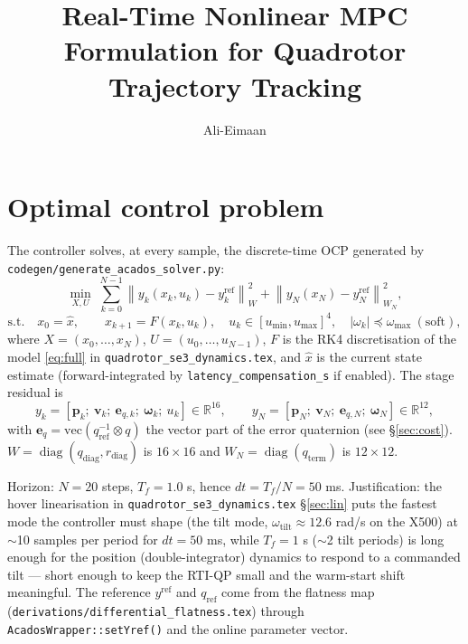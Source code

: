 \documentclass[11pt]{article}
\title{Real-Time Nonlinear MPC Formulation for Quadrotor Trajectory Tracking}
\author{Ali-Eimaan}
\date{}
\newcommand{\R}{\mathbb{R}}
\newcommand{\quatmul}{\otimes}
\DeclareMathOperator{\diag}{diag}
\begin{document}
\maketitle

\section{Optimal control problem}

The controller solves, at every sample, the discrete-time OCP generated by
\texttt{codegen/generate\_acados\_solver.py}:
\begin{equation}
  \min_{X, U} \; \sum_{k=0}^{N-1} \left\| y_k(x_k, u_k) - y^{\mathrm{ref}}_k \right\|^2_W
  + \left\| y_N(x_N) - y^{\mathrm{ref}}_N \right\|^2_{W_N},
  \label{eq:ocp}
\end{equation}
\begin{equation}
  \text{s.t.}\quad x_0 = \hat x, \qquad x_{k+1} = F(x_k, u_k), \quad
  u_k \in [u_{\min}, u_{\max}]^4, \quad
  |\omega_k| \preceq \omega_{\max} \ (\text{soft}),
  \label{eq:ocpcon}
\end{equation}
where $X = (x_0, \ldots, x_N)$, $U = (u_0, \ldots, u_{N-1})$, $F$ is the RK4
discretisation of the model \eqref{eq:full} in \texttt{quadrotor\_se3\_dynamics.tex},
and $\hat x$ is the current state estimate (forward-integrated by
\texttt{latency\_compensation\_s} if enabled). The stage residual is
\begin{equation}
  y_k = \left[ \bm p_k;\ \bm v_k;\ \bm e_{q,k};\ \bm\omega_k;\ u_k \right] \in \R^{16},
  \qquad
  y_N = \left[ \bm p_N;\ \bm v_N;\ \bm e_{q,N};\ \bm\omega_N \right] \in \R^{12},
  \label{eq:residual}
\end{equation}
with $\bm e_q = \mathrm{vec}(q_{\mathrm{ref}}^{-1} \quatmul q)$ the vector part of the
error quaternion (see \S\ref{sec:cost}). $W = \diag(q_{\mathrm{diag}}, r_{\mathrm{diag}})$
is $16\times16$ and $W_N = \diag(q_{\mathrm{term}})$ is $12\times12$.

Horizon: $N = 20$ steps, $T_f = 1.0$ s, hence $dt = T_f/N = 50$ ms. Justification: the
hover linearisation in \texttt{quadrotor\_se3\_dynamics.tex} \S\ref{sec:lin} puts the
fastest mode the controller must shape (the tilt mode, $\omega_\mathrm{tilt} \approx 12.6$
rad/s on the X500) at $\sim$10 samples per period for $dt = 50$ ms, while $T_f = 1$ s
($\sim$2 tilt periods) is long enough for the position (double-integrator) dynamics to
respond to a commanded tilt — short enough to keep the RTI-QP small and the warm-start
shift meaningful. The reference $y^{\mathrm{ref}}$ and $q_{\mathrm{ref}}$ come from the
flatness map (\texttt{derivations/differential\_flatness.tex}) through
\texttt{AcadosWrapper::setYref()} and the online parameter vector.
\end{document}
